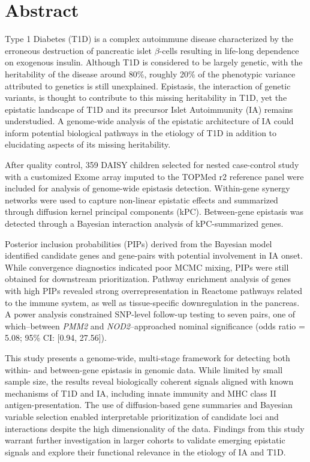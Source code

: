 \documentclass{article}\usepackage[]{graphicx}\usepackage[]{color}
\begin{document}
\section*{Abstract}  %
\par
Type 1 Diabetes (T1D) is a complex autoimmune disease characterized by the erroneous destruction of pancreatic islet $\beta$-cells resulting in life-long dependence on exogenous insulin. Although T1D is considered to be largely genetic, with the heritability of the disease around 80\%, roughly 20\% of the phenotypic variance attributed to genetics is still unexplained. Epistasis, the interaction of genetic variants, is thought to contribute to this missing heritability in T1D, yet the epistatic landscape of T1D and its precursor Islet Autoimmunity (IA) remains understudied. A genome-wide analysis of the epistatic architecture of IA could inform potential biological pathways in the etiology of T1D in addition to elucidating aspects of its missing heritability. 
\par
After quality control, 359 DAISY children selected for nested case-control study with a customized Exome array imputed to the TOPMed r2 reference panel were included for analysis of genome-wide epistasis detection. Within-gene synergy networks were used to capture non-linear epistatic effects and summarized through diffusion kernel principal components (kPC). Between-gene epistasis was detected through a Bayesian interaction analysis of kPC-summarized genes.
\par
Posterior inclusion probabilities (PIPs) derived from the Bayesian model identified candidate genes and gene-pairs with potential involvement in IA onset. While convergence diagnostics indicated poor MCMC mixing, PIPs were still obtained for downstream prioritization. Pathway enrichment analysis of genes with high PIPs revealed strong overrepresentation in Reactome pathways related to the immune system, as well as tissue-specific downregulation in the pancreas. A power analysis constrained SNP-level follow-up testing to seven pairs, one of which--between \textit{PMM2} and \textit{NOD2}--approached nominal significance (odds ratio = 5.08; 95\% CI: [0.94, 27.56]).
\par
This study presents a genome-wide, multi-stage framework for detecting both within- and between-gene epistasis in genomic data. While limited by small sample size, the results reveal biologically coherent signals aligned with known mechanisms of T1D and IA, including innate immunity and MHC class II antigen-presentation. The use of diffusion-based gene summaries and Bayesian variable selection enabled interpretable prioritization of candidate loci and interactions despite the high dimensionality of the data. Findings from this study warrant further investigation in larger cohorts to validate emerging epistatic signals and explore their functional relevance in the etiology of IA and T1D.
\end{document}
